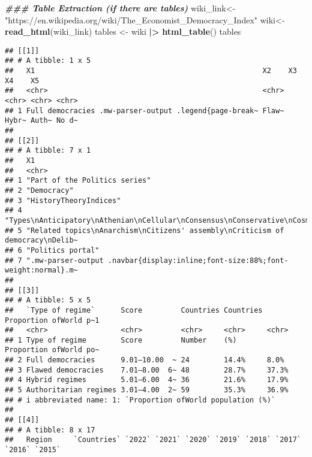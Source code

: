 \documentclass[
]{article}
\newenvironment{Shaded}{\begin{snugshade}}{\end{snugshade}}
\newcommand{\DocumentationTok}[1]{\textcolor[rgb]{0.56,0.35,0.01}{\textbf{\textit{#1}}}}
\newcommand{\FunctionTok}[1]{\textcolor[rgb]{0.13,0.29,0.53}{\textbf{#1}}}
\newcommand{\NormalTok}[1]{#1}
\newcommand{\OtherTok}[1]{\textcolor[rgb]{0.56,0.35,0.01}{#1}}
\newcommand{\SpecialCharTok}[1]{\textcolor[rgb]{0.81,0.36,0.00}{\textbf{#1}}}
\newcommand{\StringTok}[1]{\textcolor[rgb]{0.31,0.60,0.02}{#1}}
\begin{document}
\begin{Shaded}
\begin{Highlighting}[]
\DocumentationTok{\#\#\# Table Extraction (if there are tables)}
\NormalTok{wiki\_link}\OtherTok{\textless{}{-}} \StringTok{"https://en.wikipedia.org/wiki/The\_Economist\_Democracy\_Index"}
\NormalTok{wiki}\OtherTok{\textless{}{-}}\FunctionTok{read\_html}\NormalTok{(wiki\_link)}
\NormalTok{tables }\OtherTok{\textless{}{-}}\NormalTok{ wiki }\SpecialCharTok{|\textgreater{}}
  \FunctionTok{html\_table}\NormalTok{()}
\NormalTok{tables}
\end{Highlighting}
\end{Shaded}

\begin{verbatim}
## [[1]]
## # A tibble: 1 x 5
##   X1                                                     X2    X3    X4    X5   
##   <chr>                                                  <chr> <chr> <chr> <chr>
## 1 Full democracies .mw-parser-output .legend{page-break~ Flaw~ Hybr~ Auth~ No d~
## 
## [[2]]
## # A tibble: 7 x 1
##   X1                                                                            
##   <chr>                                                                         
## 1 "Part of the Politics series"                                                 
## 2 "Democracy"                                                                   
## 3 "HistoryTheoryIndices"                                                        
## 4 "Types\nAnticipatory\nAthenian\nCellular\nConsensus\nConservative\nCosmopolit~
## 5 "Related topics\nAnarchism\nCitizens' assembly\nCriticism of democracy\nDelib~
## 6 "Politics portal"                                                             
## 7 ".mw-parser-output .navbar{display:inline;font-size:88%;font-weight:normal}.m~
## 
## [[3]]
## # A tibble: 5 x 5
##   `Type of regime`      Score         Countries Countries Proportion ofWorld p~1
##   <chr>                 <chr>         <chr>     <chr>     <chr>                 
## 1 Type of regime        Score         Number    (%)       Proportion ofWorld po~
## 2 Full democracies      9.01–10.00  ~ 24        14.4%     8.0%                  
## 3 Flawed democracies    7.01–8.00  6~ 48        28.7%     37.3%                 
## 4 Hybrid regimes        5.01–6.00  4~ 36        21.6%     17.9%                 
## 5 Authoritarian regimes 3.01–4.00  2~ 59        35.3%     36.9%                 
## # i abbreviated name: 1: `Proportion ofWorld population (%)`
## 
## [[4]]
## # A tibble: 8 x 17
##   Region     `Coun­tries` `2022` `2021` `2020` `2019` `2018` `2017` `2016` `2015`

\end{verbatim}
\end{document}
